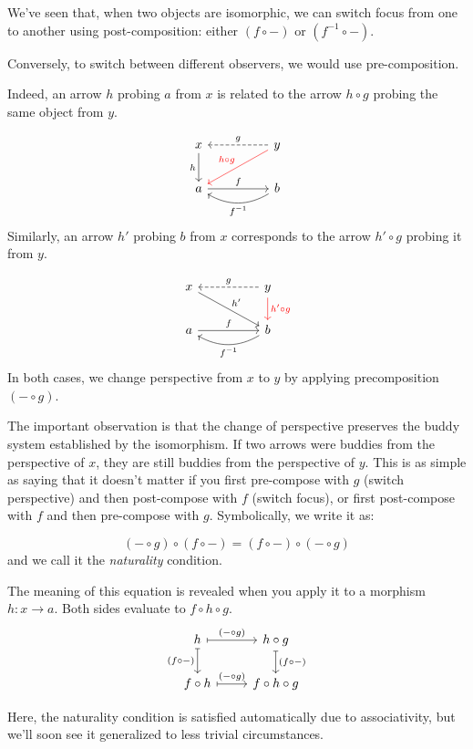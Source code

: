 \documentclass[DaoFP]{subfiles}
\begin{document}
We've seen that, when two objects are isomorphic, we can switch focus from one to another using post-composition: either $(f \circ -)$ or $(f^{-1} \circ -)$. 

Conversely, to switch between different observers, we would use pre-composition. 

Indeed, an arrow $h$ probing $a$ from $x$ is related to the arrow $h\circ g$ probing the same object from $y$.

\[
 \begin{tikzcd}
 x
 \arrow[d, "h"']
 && y
 \arrow[ll, dashed, "g"']
  \arrow[dll, red, "h \circ g"']
 \\
 a
 \arrow[rr, "f"]
  && b
 \arrow[ll, bend left,  "f^{-1}"]
 \end{tikzcd}
\]
Similarly, an arrow $h'$ probing $b$ from $x$ corresponds to the arrow $h' \circ g$ probing it from $y$. 

\[
 \begin{tikzcd}
 x
 \arrow[drr, "h'"]
 && y
 \arrow[ll, dashed, "g"']
  \arrow[d, red, "h' \circ g"]
 \\
 a
 \arrow[rr, "f"]
  && b
 \arrow[ll, bend left,  "f^{-1}"]
 \end{tikzcd}
\]
In both cases, we change perspective from $x$ to $y$ by applying precomposition $(- \circ g)$.

The important observation is that the change of perspective preserves the buddy system established by the isomorphism. If two arrows were buddies from the perspective of $x$, they are still buddies from the perspective of $y$. This is as simple as saying that it doesn't matter if you first pre-compose with $g$ (switch perspective) and then post-compose with $f$ (switch focus), or first post-compose with $f$ and then pre-compose with $g$. Symbolically, we write it as:

\[(- \circ g) \circ (f \circ -) = (f \circ -) \circ (- \circ g)\]
and we call it the \emph{naturality} condition.


The meaning of this equation is revealed when you apply it to a morphism $h \colon x \to a$. Both sides evaluate to $f \circ h \circ g$.
\[
 \begin{tikzcd}
 h
 \arrow[r, mapsto, "(- \circ g)"]
 \arrow[d, mapsto, "(f \circ -)"']
 & h \circ g
 \arrow[d, mapsto, "(f \circ -)"]
 \\
 f \circ h
 \arrow[r, mapsto, "(- \circ g)"]
& f \circ h \circ g
 \end{tikzcd}
\]

Here, the naturality condition is satisfied automatically due to associativity, but we'll soon see it generalized to less trivial circumstances.
\end{document}
